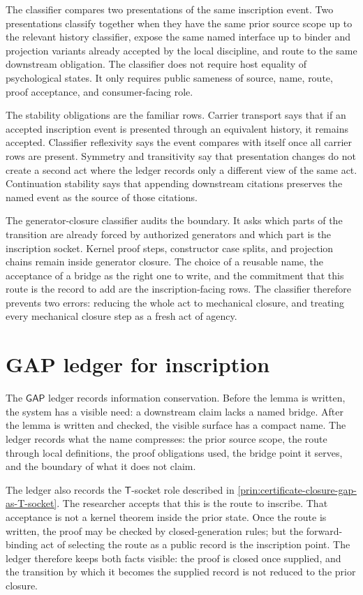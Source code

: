 The classifier compares two presentations of the same inscription event.
Two presentations classify together when they have the same prior source
scope up to the relevant history classifier, expose the same named interface
up to binder and projection variants already accepted by the local
\NameCert{} discipline, and route to the same downstream obligation.  The
classifier does not require host equality of psychological states.  It only
requires public sameness of source, name, route, proof acceptance, and
consumer-facing role.

The stability obligations are the familiar rows.  Carrier transport says
that if an accepted inscription event is presented through an equivalent
history, it remains accepted.  Classifier reflexivity says the event compares
with itself once all carrier rows are present.  Symmetry and transitivity say
that presentation changes do not create a second act where the ledger records
only a different view of the same act.  Continuation stability says that
appending downstream citations preserves the named event as the source of
those citations.

The generator-closure classifier audits the boundary.  It asks which parts
of the transition are already forced by authorized generators and which part
is the inscription socket.  Kernel proof steps, constructor case splits, and
projection chains remain inside generator closure.  The choice of a reusable
name, the acceptance of a bridge as the right one to write, and the
commitment that this route is the record to add are the inscription-facing
rows.  The classifier therefore prevents two errors: reducing the whole act
to mechanical closure, and treating every mechanical closure step as a fresh
act of agency.

\section{GAP ledger for inscription}
\label{sec:inscription-event-gap-ledger}

The $\mathsf{GAP}$ ledger records information conservation.  Before the
lemma is written, the system has a visible need: a downstream claim lacks a
named bridge.  After the lemma is written and checked, the visible surface
has a compact name.  The ledger records what the name compresses: the prior
source scope, the route through local definitions, the proof obligations
used, the bridge point it serves, and the boundary of what it does not
claim.

The ledger also records the $\mathsf{T}$-socket role described in
\autoref{prin:certificate-closure-gap-as-T-socket}.  The researcher accepts
that this is the route to inscribe.  That acceptance is not a kernel theorem
inside the prior state.  Once the route is written, the proof may be checked
by closed-generation rules; but the forward-binding act of selecting the
route as a public record is the inscription point.  The ledger therefore
keeps both facts visible: the proof is closed once supplied, and the
transition by which it becomes the supplied record is not reduced to the
prior closure.

